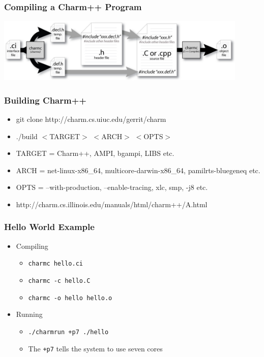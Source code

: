 
\begin{frame}
   \frametitle{Compiling a Charm++ Program}
   \begin{center}
     \includegraphics[width=0.9\textwidth]{figures/charmCompile.jpg}
   \end{center}
\end{frame}

\begin{frame}
  \frametitle{Building Charm++}
  \begin{itemize}
  \item git clone http://charm.cs.uiuc.edu/gerrit/charm
  \item ./build $<$TARGET$>$ $<$ARCH$>$ $<$OPTS$>$
  \item TARGET = Charm++, AMPI, bgampi, LIBS etc.
  \item ARCH = net-linux-x86\_64, multicore-darwin-x86\_64, pamilrts-bluegeneq etc.
  \item OPTS = --with-production, --enable-tracing, xlc, smp, -j8 etc.
  \item http://charm.cs.illinois.edu/manuals/html/charm++/A.html
  \end{itemize}
\end{frame}

\begin{frame}
  \frametitle{Hello World Example}
  \begin{itemize}
    \item Compiling
      \begin{itemize}
      \item \texttt{charmc hello.ci}
      \item \texttt{charmc -c hello.C}
      \item \texttt{charmc -o hello hello.o}
      \end{itemize}
    \item Running
      \begin{itemize}
      \item \texttt{./charmrun +p7 ./hello}
      \item The \texttt{+p7} tells the system to use seven cores
      \end{itemize}
    \end{itemize}
\end{frame}

